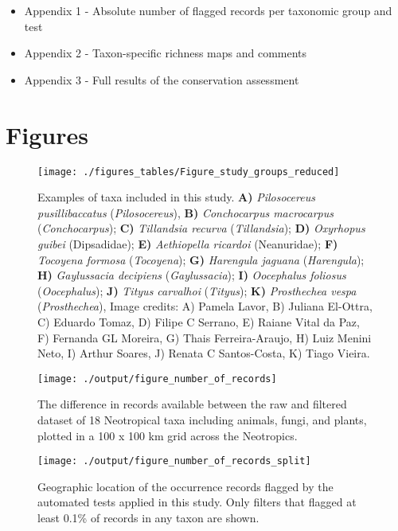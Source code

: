 \documentclass[fleqn,10pt,lineno]{wlpeerj} %
\begin{document}
\begin{itemize}
\item
  Appendix 1 - Absolute number of flagged records per taxonomic group and test
\item
  Appendix 2 - Taxon-specific richness maps and comments
\item
  Appendix 3 - Full results of the conservation assessment
\end{itemize}

\hypertarget{figures}{%
\section*{Figures}\label{figures}}

\begin{figure}
\texttt{[image: ./figures\_tables/Figure\_study\_groups\_reduced]} \caption{Examples of taxa included in this study. \textbf{A)} \textit{Pilosocereus pusillibaccatus} (\textit{Pilosocereus}), \textbf{B)} \textit{Conchocarpus macrocarpus} (\textit{Conchocarpus}); \textbf{C)} \textit{Tillandsia recurva} (\textit{Tillandsia}); \textbf{D)} \textit{Oxyrhopus guibei} (Dipsadidae); \textbf{E)} \textit{Aethiopella ricardoi} (Neanuridae); \textbf{F)} \textit{Tocoyena formosa} (\textit{Tocoyena}); \textbf{G)} \textit{Harengula jaguana} (\textit{Harengula}); \textbf{H)} \textit{Gaylussacia decipiens} (\textit{Gaylussacia}); \textbf{I)} \textit{Oocephalus foliosus} (\textit{Oocephalus}); \textbf{J)} \textit{Tityus carvalhoi} (\textit{Tityus}); \textbf{K)} \textit{Prosthechea vespa} (\textit{Prosthechea}), Image credits: A) Pamela Lavor, B) Juliana El-Ottra, C) Eduardo Tomaz, D) Filipe C Serrano, E) Raiane Vital da Paz, F) Fernanda GL Moreira, G) Thais Ferreira-Araujo, H) Luiz Menini Neto, I) Arthur Soares, J) Renata C Santos-Costa, K) Tiago Vieira.}\label{fig:species}
\end{figure}

\begin{figure}
\texttt{[image: ./output/figure\_number\_of\_records]} \caption{The difference in records available between the raw and filtered dataset of 18 Neotropical taxa including animals, fungi, and plants, plotted in a 100 x 100 km grid across the Neotropics.}\label{fig:total}
\end{figure}

\begin{figure}
\texttt{[image: ./output/figure\_number\_of\_records\_split]} \caption{Geographic location of the occurrence records flagged by the automated tests applied in this study. Only filters that flagged at least 0.1\% of records in any taxon are shown.}\label{fig:split}
\end{figure}
\end{document}
